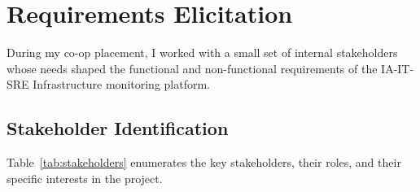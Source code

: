 ﻿%

\chapter{Requirements Elicitation}
\label{chap:requirements}

During my co-op placement, I worked with a small set of internal stakeholders
whose needs shaped the functional and non-functional requirements of the
IA-IT-SRE Infrastructure monitoring platform.


\FloatBarrier

\section{Stakeholder Identification}
\label{sec:stakeholders}


Table~\ref{tab:stakeholders} enumerates the key
stakeholders, their roles, and their specific interests in the
project.

